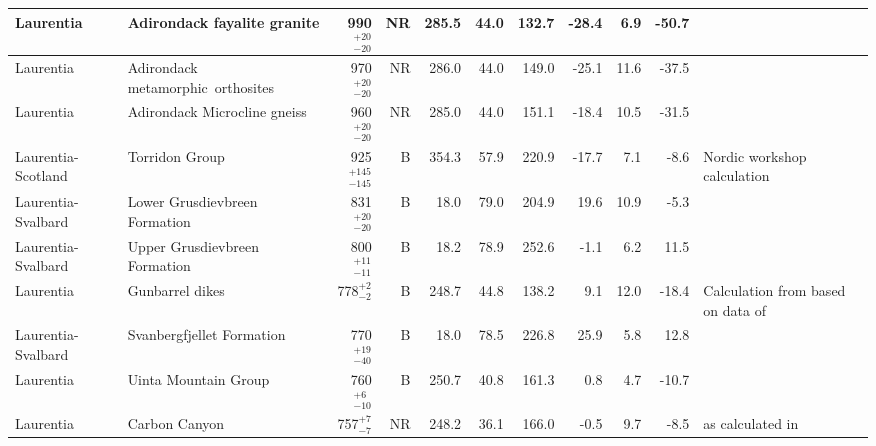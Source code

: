 \documentclass[twocolumn, switch]{article} %
\begin{document}
{\begin{landscape}
\begin{ThreePartTable}
\begin{longtable}{p{1.4 in}p{1.2 in}rrrrrrrrp{1.2 in}}
                     Laurentia &                        Adirondack fayalite granite &    990$^{+20}_{-20}$ &     NR &     285.5 &      44.0 & 132.7 & -28.4 &       6.9 &       -50.7 &                                  \cite{Brown2012a} \\ \hline
                     Laurentia &               Adirondack metamorphic\ orthosites &    970$^{+20}_{-20}$ &     NR &     286.0 &      44.0 & 149.0 & -25.1 &      11.6 &       -37.5 &                                  \cite{Brown2012a} \\ \hline
                     Laurentia &                       Adirondack Microcline gneiss &    960$^{+20}_{-20}$ &     NR &     285.0 &      44.0 & 151.1 & -18.4 &      10.5 &       -31.5 &                                  \cite{Brown2012a} \\ \hline
            Laurentia-Scotland &                                     Torridon Group &  925$^{+145}_{-145}$ &      B &     354.3 &      57.9 & 220.9 & -17.7 &       7.1 &        -8.6 &                        Nordic workshop calculation \\ \hline
            Laurentia-Svalbard &                      Lower Grusdievbreen Formation &    831$^{+20}_{-20}$ &      B &      18.0 &      79.0 & 204.9 &  19.6 &      10.9 &        -5.3 &                                 \cite{Maloof2006a} \\ \hline
            Laurentia-Svalbard &                      Upper Grusdievbreen Formation &    800$^{+11}_{-11}$ &      B &      18.2 &      78.9 & 252.6 &  -1.1 &       6.2 &        11.5 &                                 \cite{Maloof2006a} \\ \hline
                     Laurentia &                                    Gunbarrel dikes &      778$^{+2}_{-2}$ &      B &     248.7 &      44.8 & 138.2 &   9.1 &      12.0 &       -18.4 &  Calculation from \cite{Eyster2019a} based on data of \cite{Harlan1993a, Harlan1997a} \\ \hline
            Laurentia-Svalbard &                          Svanbergfjellet Formation &    770$^{+19}_{-40}$ &      B &      18.0 &      78.5 & 226.8 &  25.9 &       5.8 &        12.8 &                                 \cite{Maloof2006a} \\ \hline
                     Laurentia &                               Uinta Mountain Group &     760$^{+6}_{-10}$ &      B &     250.7 &      40.8 & 161.3 &   0.8 &       4.7 &       -10.7 &                                   \cite{Weil2006b} \\ \hline
                     Laurentia &                                      Carbon Canyon &      757$^{+7}_{-7}$ &     NR &     248.2 &      36.1 & 166.0 &  -0.5 &       9.7 &        -8.5 &  \cite{Weil2004a} as calculated in \cite{Eyster2019a} \\ \hline

\end{longtable}
\end{ThreePartTable}
\end{landscape}}
\end{document}
